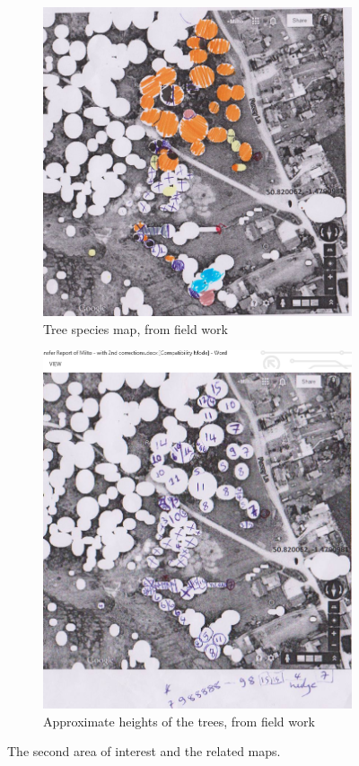 \documentclass{subfiles}
\begin{document}
\begin{figure} [h!]
\begin{subfigure}[t]{.5\textwidth}
	   		\centering
	   		\includegraphics[width=.9\textwidth]{img/NewForest/Area2Fieldwork_Species}
	   		\caption{Tree species map, from field work}
	   		\label{fig:Area2Fieldwork_Species}
	   	\end{subfigure} \hfill
	   	\begin{subfigure}[t]{.5\textwidth}
	   		\centering
	   		\includegraphics[width=.9\textwidth]{img/NewForest/Area2Fieldwork_Heights}
	   		\caption{Approximate heights of the trees, from field work} 
	   		\label{fig:Area2Fieldwork_Heights}
	   	\end{subfigure}
	   	\caption{The second area of interest and the related maps.} %
	   	\label{fig:NF_Area2} 
	   \end{figure}
	   
\end{document}
